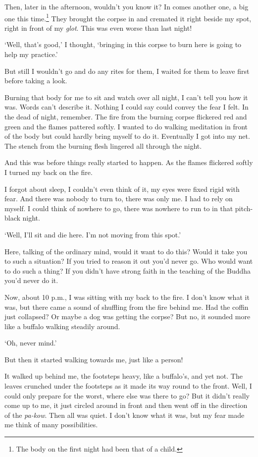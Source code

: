 Then, later in the afternoon, wouldn't you know it? In comes another one, a big one this time.\footnote{The body on the first night had been that of a child.} They brought the corpse in and cremated it right beside my spot, right in front of my \textit{glot}. This was even worse than last night! 

`Well, that's good,' I thought, `bringing in this corpse to burn here is going to help my practice.' 

But still I wouldn't go and do any rites for them, I waited for them to leave first before taking a look. 

Burning that body for me to sit and watch over all night, I can't tell you how it was. Words can't describe it. Nothing I could say could convey the fear I felt. In the dead of night, remember. The fire from the burning corpse flickered red and green and the flames pattered softly. I wanted to do walking meditation in front of the body but could hardly bring myself to do it. Eventually I got into my net. The stench from the burning flesh lingered all through the night. 

And this was before things really started to happen. As the flames flickered softly I turned my back on the fire. 

I forgot about sleep, I couldn't even think of it, my eyes were fixed rigid with fear. And there was nobody to turn to, there was only me. I had to rely on myself. I could think of nowhere to go, there was nowhere to run to in that pitch-black night. 

`Well, I'll sit and die here. I'm not moving from this spot.' 

Here, talking of the ordinary mind, would it want to do this? Would it take you to such a situation? If you tried to reason it out you'd never go. Who would want to do such a thing? If you didn't have strong faith in the teaching of the Buddha you'd never do it. 

Now, about 10 p.m., I was sitting with my back to the fire. I don't know what it was, but there came a sound of shuffling from the fire behind me. Had the coffin just collapsed? Or maybe a dog was getting the corpse? But no, it sounded more like a buffalo walking steadily around.

`Oh, never mind.' 

But then it started walking towards me, just like a person! 

It walked up behind me, the footsteps heavy, like a buffalo's, and yet not. The leaves crunched under the footsteps as it made its way round to the front. Well, I could only prepare for the worst, where else was there to go? But it didn't really come up to me, it just circled around in front and then went off in the direction of the \textit{pa-kow}. Then all was quiet. I don't know what it was, but my fear made me think of many possibilities. 

